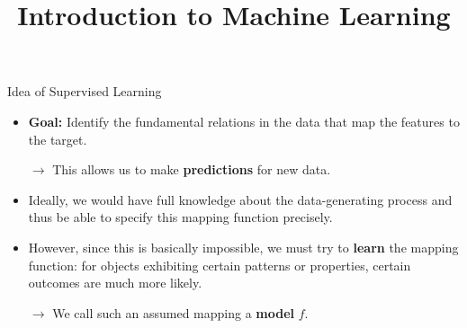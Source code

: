 \documentclass[11pt,compress,t,notes=noshow, xcolor=table]{beamer}
\title{Introduction to Machine Learning}
\institute{\href{https://compstat-lmu.github.io/lecture_i2ml/}{compstat-lmu.github.io/lecture\_i2ml}}
\date{}
\begin{document}









\begin{vbframe}{Idea of Supervised Learning}

\begin{itemize}

  \item \textbf{Goal:} Identify the fundamental relations in the data that map
  the features to the target.
  
  $\rightarrow$ This allows us to make \textbf{predictions} for new data.
  
  \item Ideally, we would have full knowledge about the data-generating process
  and thus be able to specify this mapping function precisely.
  
  \item However, since this is basically impossible, we must try to 
  \textbf{learn} the mapping function: for objects exhibiting certain 
  patterns or properties, certain outcomes are much more likely.
  
  $\rightarrow$ We call such an assumed mapping a \textbf{model} $f$.

\end{itemize}  

\end{vbframe}

\end{document}
